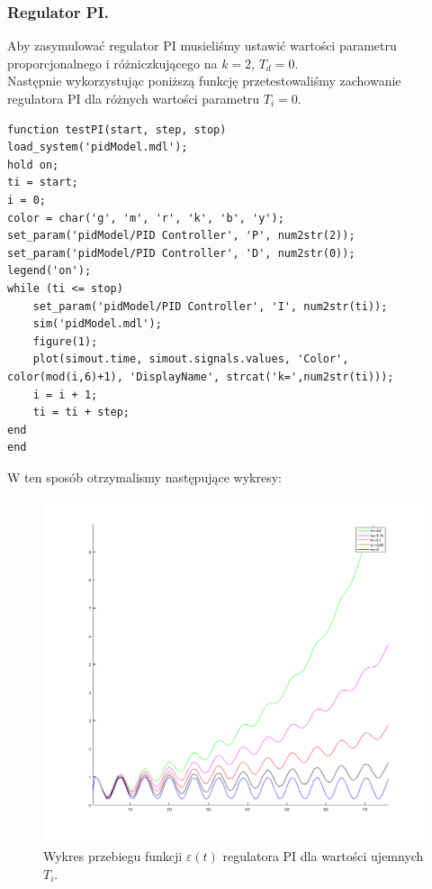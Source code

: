 \documentclass[a4paper,10pt]{article}
\begin{document}
\subsubsection{Regulator PI.}\label{sec:regPI}
Aby zasymulować regulator PI musieliśmy ustawić wartości parametru proporcjonalnego i różniczkującego na $k=2$, $T_{d}=0$. \\
Następnie wykorzystując poniższą funkcję przetestowaliśmy zachowanie regulatora PI dla różnych wartości parametru $T_{i}=0$. \\
\begin{lstlisting}[caption=Funkcja testująca regulator PI.]
function testPI(start, step, stop)
load_system('pidModel.mdl');
hold on;
ti = start;
i = 0;
color = char('g', 'm', 'r', 'k', 'b', 'y');
set_param('pidModel/PID Controller', 'P', num2str(2));
set_param('pidModel/PID Controller', 'D', num2str(0));
legend('on');
while (ti <= stop)
	set_param('pidModel/PID Controller', 'I', num2str(ti));
	sim('pidModel.mdl');
	figure(1);
	plot(simout.time, simout.signals.values, 'Color', color(mod(i,6)+1), 'DisplayName', strcat('k=',num2str(ti)));
	i = i + 1;
	ti = ti + step;
end
end
\end{lstlisting}
W ten sposób otrzymalismy następujące wykresy: \\
\begin{figure}[!h]
    \centering
	\includegraphics[width=130mm]{PI-ku.png}
	\caption{Wykres przebiegu funkcji $\varepsilon(t)$ regulatora PI dla wartości ujemnych $T_{i}$.}
    \label{fig:regulatorPIeu}
\end{figure}
\end{document}
